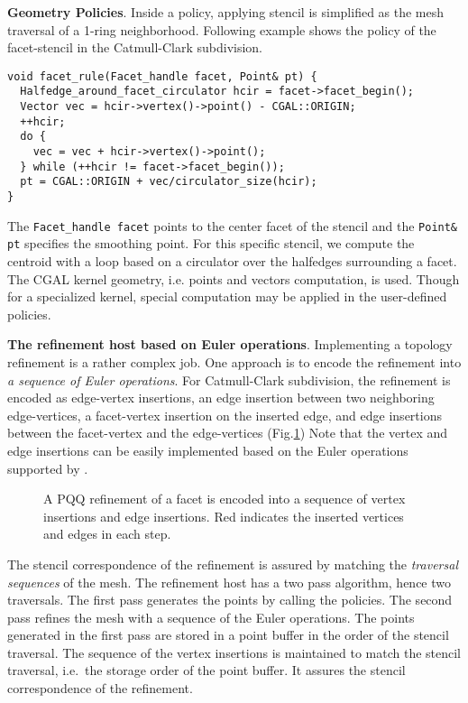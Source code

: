 \noindent\textbf{Geometry Policies}.
Inside a policy, applying stencil is simplified as 
the mesh traversal of a 1-ring neighborhood. 
Following example shows the policy of the facet-stencil 
in the Catmull-Clark subdivision.
\begin{lstlisting}
void facet_rule(Facet_handle facet, Point& pt) {
  Halfedge_around_facet_circulator hcir = facet->facet_begin();
  Vector vec = hcir->vertex()->point() - CGAL::ORIGIN;
  ++hcir;
  do {
    vec = vec + hcir->vertex()->point();
  } while (++hcir != facet->facet_begin());
  pt = CGAL::ORIGIN + vec/circulator_size(hcir);
}
\end{lstlisting}
The \lstinline!Facet_handle facet! points to the 
center facet of the stencil and the \lstinline!Point& pt! 
specifies the smoothing point. For this specific stencil, 
we compute the centroid with a loop based on a circulator 
over the halfedges surrounding a facet. The CGAL kernel 
geometry, i.e. points and vectors computation, is used. 
Though for a specialized kernel, special computation may be 
applied in the user-defined policies.
 
\noindent\textbf{The refinement host based on Euler operations}.
Implementing a topology refinement is a rather complex job. One
approach is to encode the refinement into \emph{a sequence of Euler
operations}. For Catmull-Clark subdivision, the refinement is encoded
as edge-vertex insertions, an edge insertion between two neighboring
edge-vertices, a facet-vertex insertion on the inserted edge, and 
edge insertions between the facet-vertex and the edge-vertices 
(Fig.\ref{fig:CCRefinement}) 
Note that the vertex and edge insertions can be easily 
implemented based on the Euler operations supported by \cgalpoly.
\begin{figure}
  \centering
  \caption{A PQQ refinement of a facet is encoded into a sequence of
  vertex insertions and edge insertions. Red indicates the inserted
  vertices and edges in each step.}
  \label{fig:CCRefinement}
\end{figure}

The stencil correspondence of the refinement is assured
by matching the \emph{traversal sequences} of the mesh. 
The refinement host has a two pass algorithm, hence two 
traversals. The first pass generates the points by 
calling the policies. The second pass
refines the mesh with a sequence of the Euler operations.
The points generated in the first pass are stored in a
point buffer in the order of the stencil 
traversal. The sequence of the vertex insertions 
is maintained to match the stencil traversal, i.e.\ 
the storage order of the point buffer. It assures 
the stencil correspondence of the refinement.

